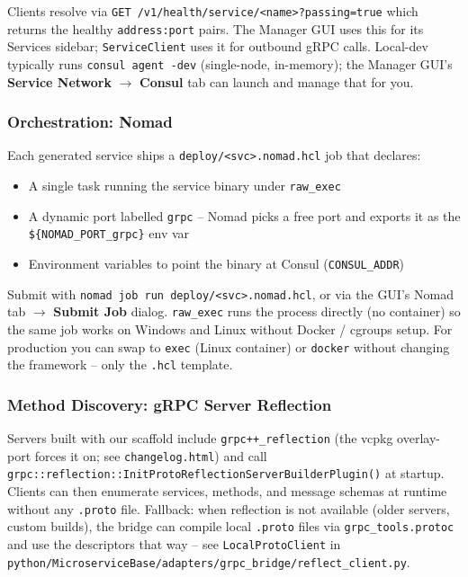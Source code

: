 \noindent
Clients resolve via \texttt{GET /v1/health/service/<name>?passing=true} which returns
the healthy \texttt{address:port} pairs.  The Manager GUI uses this for its Services
sidebar; \texttt{ServiceClient} uses it for outbound gRPC calls.  Local-dev typically
runs \texttt{consul agent -dev} (single-node, in-memory); the Manager GUI's
\textbf{Service Network} \(\to\) \textbf{Consul} tab can launch and manage that for you.

\subsubsection{Orchestration: Nomad}

Each generated service ships a \texttt{deploy/<svc>.nomad.hcl} job that declares:

\begin{itemize}
   \item A single task running the service binary under \texttt{raw\_exec}
   \item A dynamic port labelled \texttt{grpc} -- Nomad picks a free port and exports it
        as the \texttt{\$\{NOMAD\_PORT\_grpc\}} env var
   \item Environment variables to point the binary at Consul (\texttt{CONSUL\_ADDR})
\end{itemize}

\noindent
Submit with \texttt{nomad job run deploy/<svc>.nomad.hcl}, or via the GUI's Nomad tab
\(\to\) \textbf{Submit Job} dialog.  \texttt{raw\_exec} runs the process directly (no
container) so the same job works on Windows and Linux without Docker / cgroups setup.
For production you can swap to \texttt{exec} (Linux container) or \texttt{docker}
without changing the framework -- only the \texttt{.hcl} template.

\subsubsection{Method Discovery: gRPC Server Reflection}

Servers built with our scaffold include \texttt{grpc++\_reflection} (the vcpkg
overlay-port forces it on; see \texttt{changelog.html}) and call
\texttt{grpc::reflection::InitProtoReflectionServerBuilderPlugin()} at startup.
Clients can then enumerate services, methods, and message schemas at runtime
without any \texttt{.proto} file.  Fallback: when reflection is not available
(older servers, custom builds), the bridge can compile local \texttt{.proto}
files via \texttt{grpc\_tools.protoc} and use the descriptors that way -- see
\texttt{LocalProtoClient} in
\texttt{python/MicroserviceBase/adapters/grpc\_bridge/reflect\_client.py}.

